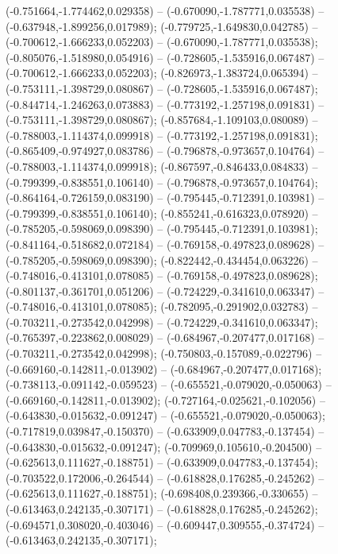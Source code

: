  (-0.751664,-1.774462,0.029358) -- (-0.670090,-1.787771,0.035538) -- (-0.637948,-1.899256,0.017989);
 (-0.779725,-1.649830,0.042785) -- (-0.700612,-1.666233,0.052203) -- (-0.670090,-1.787771,0.035538);
 (-0.805076,-1.518980,0.054916) -- (-0.728605,-1.535916,0.067487) -- (-0.700612,-1.666233,0.052203);
 (-0.826973,-1.383724,0.065394) -- (-0.753111,-1.398729,0.080867) -- (-0.728605,-1.535916,0.067487);
 (-0.844714,-1.246263,0.073883) -- (-0.773192,-1.257198,0.091831) -- (-0.753111,-1.398729,0.080867);
 (-0.857684,-1.109103,0.080089) -- (-0.788003,-1.114374,0.099918) -- (-0.773192,-1.257198,0.091831);
 (-0.865409,-0.974927,0.083786) -- (-0.796878,-0.973657,0.104764) -- (-0.788003,-1.114374,0.099918);
 (-0.867597,-0.846433,0.084833) -- (-0.799399,-0.838551,0.106140) -- (-0.796878,-0.973657,0.104764);
 (-0.864164,-0.726159,0.083190) -- (-0.795445,-0.712391,0.103981) -- (-0.799399,-0.838551,0.106140);
 (-0.855241,-0.616323,0.078920) -- (-0.785205,-0.598069,0.098390) -- (-0.795445,-0.712391,0.103981);
 (-0.841164,-0.518682,0.072184) -- (-0.769158,-0.497823,0.089628) -- (-0.785205,-0.598069,0.098390);
 (-0.822442,-0.434454,0.063226) -- (-0.748016,-0.413101,0.078085) -- (-0.769158,-0.497823,0.089628);
 (-0.801137,-0.361701,0.051206) -- (-0.724229,-0.341610,0.063347) -- (-0.748016,-0.413101,0.078085);
 (-0.782095,-0.291902,0.032783) -- (-0.703211,-0.273542,0.042998) -- (-0.724229,-0.341610,0.063347);
 (-0.765397,-0.223862,0.008029) -- (-0.684967,-0.207477,0.017168) -- (-0.703211,-0.273542,0.042998);
 (-0.750803,-0.157089,-0.022796) -- (-0.669160,-0.142811,-0.013902) -- (-0.684967,-0.207477,0.017168);
 (-0.738113,-0.091142,-0.059523) -- (-0.655521,-0.079020,-0.050063) -- (-0.669160,-0.142811,-0.013902);
 (-0.727164,-0.025621,-0.102056) -- (-0.643830,-0.015632,-0.091247) -- (-0.655521,-0.079020,-0.050063);
 (-0.717819,0.039847,-0.150370) -- (-0.633909,0.047783,-0.137454) -- (-0.643830,-0.015632,-0.091247);
 (-0.709969,0.105610,-0.204500) -- (-0.625613,0.111627,-0.188751) -- (-0.633909,0.047783,-0.137454);
 (-0.703522,0.172006,-0.264544) -- (-0.618828,0.176285,-0.245262) -- (-0.625613,0.111627,-0.188751);
 (-0.698408,0.239366,-0.330655) -- (-0.613463,0.242135,-0.307171) -- (-0.618828,0.176285,-0.245262);
 (-0.694571,0.308020,-0.403046) -- (-0.609447,0.309555,-0.374724) -- (-0.613463,0.242135,-0.307171);
